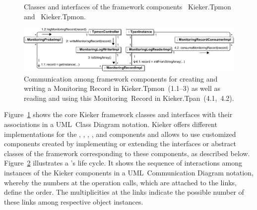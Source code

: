 \begin{figure}
{}
\caption{Classes and interfaces of the framework components %
~Kieker.Tpmon and %
~Kieker.Tpmon. %
}
\label{fig:kieker:coreFrameworkClassesAndInterfaces}%
\end{figure}


\begin{figure}\centering
\includegraphics[width=1\textwidth]{figures/kiekerCommunications-revisedReArranged-woMonitoringLog-bw}%
\caption{Communication among framework components %
for creating and writing a Monitoring Record in Kieker.Tpmon~(1.1--3) as well as %
reading and using this Monitoring~Record in Kieker.Tpan~(4.1,~4.2). %
}
\label{fig:kieker:communicationsAmongCoreFrameworkComponents}
\end{figure}

Figure~\ref{fig:kieker:coreFrameworkClassesAndInterfaces} shows the core
Kieker framework classes and interfaces with their associations in a UML~Class %
Diagram notation. %
Kieker offers different implementations for the \MonitoringRecord{}, %
\MonitoringProbe{}, \MonitoringLogWriter{}, %
\MonitoringLogReader{}, and \MonitoringRecordConsumer{} %
components and allows to use customized components created by implementing or %
extending the interfaces or abstract classes of the framework corresponding to these components, as described below.
% 
% 
Figure~\ref{fig:kieker:communicationsAmongCoreFrameworkComponents} illustrates a \MonitoringRecord{}'s life cycle. It shows the
sequence of interactions among instances of the
Kieker components in a UML~Communication Diagram
notation, whereby the numbers at the operation calls, which are attached to the links, define the order. The multiplicities at the links indicate the possible number of these links among respective object instances.


